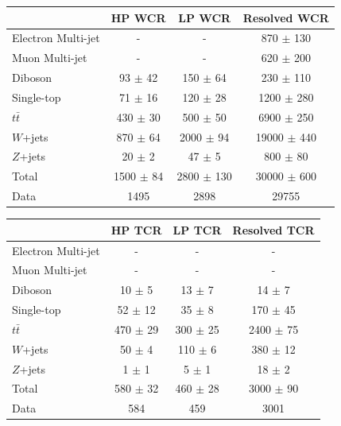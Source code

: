 \begin{table}

\begin{tabular}{|l|c|c|c|}
\hline
	  &	 HP WCR &	 LP WCR &	Resolved WCR \\\hline 
	Electron Multi-jet &	- &	- &	870 $\pm$ 130\\\hline 
	Muon Multi-jet &	- &	- &	620 $\pm$ 200 \\\hline 
	Diboson &	93 $\pm$ 42&	150 $\pm$ 64 &	230 $\pm$ 110 \\\hline 
	Single-top &	71 $\pm$ 16 &	120 $\pm$ 28 &	1200 $\pm$ 280 \\\hline 
	$t\bar{t}$ &	430 $\pm$ 30 &	500 $\pm$ 50 &	6900 $\pm$ 250 \\\hline 
	$W$+jets &	870 $\pm$ 64 &	2000 $\pm$ 94 &	19000 $\pm$ 440 \\\hline 
	$Z$+jets &	20 $\pm$ 2 &	47 $\pm$ 5 &	800 $\pm$ 80 \\\hline 
	Total &	1500 $\pm$ 84 &	2800 $\pm$ 130 &	30000 $\pm$ 600 \\\hline 
	Data &	1495 &	2898 &	29755 \\\hline 
\end{tabular}

\begin{tabular}{|l|c|c|c|}
\hline
	  &	 HP TCR &	 LP TCR &	Resolved TCR \\\hline 
	Electron Multi-jet &	- &	- &	- \\\hline 
	Muon Multi-jet &	- &	- &	- \\\hline 
	Diboson &	10 $\pm$ 5 &	13 $\pm$ 7 &	14 $\pm$ 7 \\\hline 
	Single-top &	52 $\pm$ 12 &	35 $\pm$ 8 &	170 $\pm$ 45 \\\hline 
	$t\bar{t}$ &	470 $\pm$ 29 &	300 $\pm$ 25 &	2400 $\pm$ 75 \\\hline 
	$W$+jets &	50 $\pm$ 4 &	110 $\pm$ 6 &	380 $\pm$ 12 \\\hline 
	$Z$+jets &	1 $\pm$ 1 &	5 $\pm$ 1 &	18 $\pm$ 2\\\hline 
	Total &	580 $\pm$ 32 &	460 $\pm$ 28 &	3000 $\pm$ 90 \\\hline 
	Data &	584 &	459 &	3001 \\\hline 
\end{tabular}


\end{table}
